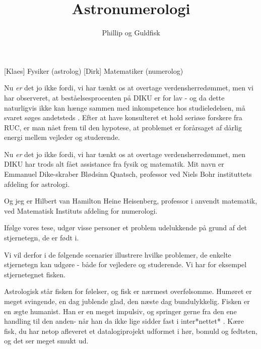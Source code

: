 \documentclass[a4paper,11pt]{article}
\title{Astronumerologi}
\author{Phillip og Guldfisk}
\begin{document}
\maketitle

\begin{roles}
[Klaes] Fysiker (astrolog)
[Dirk] Matematiker (numerolog)
\end{roles}

\begin{props}
\end{props}
  
\begin{sketch}


 Nu \textit{er} det jo ikke fordi, vi har tænkt os at overtage verdensherredømmet, men vi har observeret, at beståelsesprocenten på DIKU er for lav - og da dette naturligvis ikke kan hænge sammen med inkompetence hos studieledelsen, må svaret søges andetsteds . Efter at have konsulteret et hold seriøse forskere fra RUC, er man nået frem til den hypotese, at problemet er forårsaget af dårlig energi mellem vejleder og studerende.

 Nu \textit{er} det jo ikke fordi, vi har tænkt os at overtage verdensherredømmet, men DIKU har trods alt fået assistance fra fysik og matematik. Mit navn er Emmanuel Dike-skraber Blødsinn Quatsch, professor ved Niels Bohr instituttets afdeling for astrologi.

 Og jeg er Hilbert van Hamilton Heine Heisenberg, professor i anvendt matematik, ved Matematisk Instituts afdeling for numerologi.

 Ifølge vores tese, udgør visse personer et problem udelukkende på grund af det stjernetegn, de er født i.

 Vi vil derfor i de følgende scenarier illustrere hvilke problemer, de enkelte stjernetegn kan udgøre - både for vejledere og studerende. Vi har for eksempel stjernetegnet fisken.

 Astrologisk står fisken for følelser, og fisk er nærmest overfølsomme. Humøret er meget svingende, en dag jublende glad, den næste dag bundulykkelig. Fisken er en ægte humanist. Han er en meget impulsiv, og springer gerne fra den ene handling til den anden- når han da ikke lige sidder fast i inter*nettet* . Kære fisk, du har netop afleveret et datalogiprojekt udformet i hør, bomuld og fedtsten, og det ser meget smukt ud.


\end{sketch}
\end{document}
